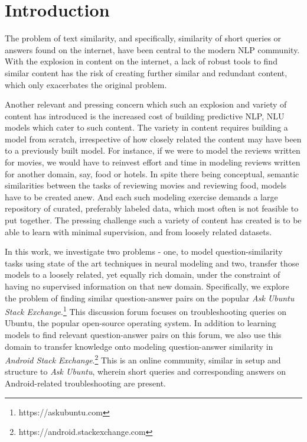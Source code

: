 \documentclass{sigkddExp}
\begin{document}
\section{Introduction}
The problem of text similarity, and specifically, similarity of short queries or answers found on the internet, have been central to the modern NLP community. With the explosion in content on the internet, a lack of robust tools to find similar content has the risk of creating further similar and redundant content, which only exacerbates the original problem.

Another relevant and pressing concern which such an explosion and variety of content has introduced is the increased cost of building predictive NLP, NLU models which cater to such content. The variety in content requires building a model from scratch, irrespective of how closely related the content may have been to a previously built model. For instance, if we were to model the reviews written for movies, we would have to reinvest effort and time in modeling reviews written for another domain, say, food or hotels. In spite there being conceptual, semantic similarities between the tasks of reviewing movies and reviewing food, models have to be created anew. And each such modeling exercise demands a large repository of curated, preferably labeled data, which most often is not feasible to put together. The pressing challenge such a variety of content has created is to be able to learn with minimal supervision, and from loosely related datasets.

In this work, we investigate two problems - one, to model question-similarity tasks using state of the art techniques in neural modeling and two, transfer those models to a loosely related, yet equally rich domain, under the constraint of having no supervised information on that new domain. Specifically, we explore the problem of finding similar question-answer pairs on the popular \textit{Ask Ubuntu Stack Exchange}.\footnote{https://askubuntu.com} This discussion forum focuses on troubleshooting queries on Ubuntu, the popular open-source operating system. In addition to  learning models to find relevant question-answer pairs on this forum, we also use this domain to transfer knowledge onto modeling question-answer similarity in \textit{Android Stack Exchange}.\footnote{https://android.stackexchange.com} This is an online community, similar in setup and structure to \textit{Ask Ubuntu}, wherein short queries and corresponding answers on Android-related troubleshooting are present.
\end{document}
